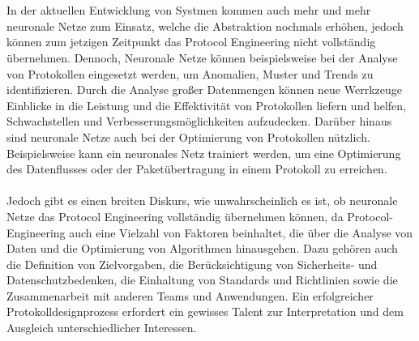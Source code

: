 \\\\
In der aktuellen Entwicklung von Systmen kommen auch mehr und mehr neuronale Netze zum Einsatz, welche die Abstraktion nochmals erhöhen, jedoch können zum jetzigen Zeitpunkt das Protocol Engineering nicht vollständig übernehmen. Dennoch, Neuronale Netze können beispielsweise bei der Analyse von Protokollen eingesetzt werden, um Anomalien, Muster und Trends zu identifizieren. Durch die Analyse großer Datenmengen können neue Werrkzeuge Einblicke in die Leistung und die Effektivität von Protokollen liefern und helfen, Schwachstellen und Verbesserungsmöglichkeiten aufzudecken. Darüber hinaus sind neuronale Netze auch bei der Optimierung von Protokollen nützlich. Beispielsweise kann ein neuronales Netz trainiert werden, um eine Optimierung des Datenflusses oder der Paketübertragung in einem Protokoll zu erreichen.
\\\\
Jedoch gibt es einen breiten Diskurs, wie unwahrscheinlich es ist, ob neuronale Netze das Protocol Engineering vollständig übernehmen können, da Protocol-Engineering auch eine Vielzahl von Faktoren beinhaltet, die über die Analyse von Daten und die Optimierung von Algorithmen hinausgehen. Dazu gehören auch die Definition von Zielvorgaben, die Berücksichtigung von Sicherheits- und Datenschutzbedenken, die Einhaltung von Standards und Richtlinien sowie die Zusammenarbeit mit anderen Teams und Anwendungen. Ein erfolgreicher Protokolldesignprozess erfordert ein gewisses Talent zur Interpretation und dem Ausgleich unterschiedlicher Interessen.


